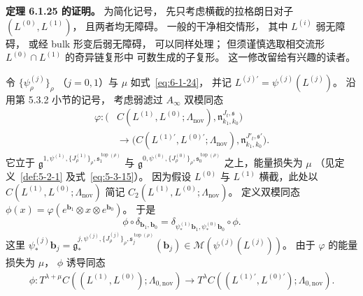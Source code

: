 \noindent\textbf{定理 6.1.25 的证明。}
为简化记号，
先只考虑横截的拉格朗日对子
$(L^{(0)},L^{(1)})$，
且两者均无障碍。
一般的干净相交情形，
其中 $L^{(i)}$ 弱无障碍，
或经 bulk 形变后弱无障碍，
可以同样处理；
但须谨慎选取相交流形
$L^{(0)}\cap L^{(1)}$
的奇异链复形中
可数生成的子复形。
这一修改留给有兴趣的读者。

令 $\{\psi_\rho^{(j)}\}_\rho$
（$j=0,1$）与 $\mu$
如式~\eqref{eq:6-1-24}，
并记 $L^{(j)\prime}=\psi^{(j)}(L^{(j)})$。
沿用第 5.3.2 小节的记号，
考虑弱滤过 $A_\infty$ 双模同态
\begin{equation}
\begin{aligned}
\varphi:\bigl(&C(L^{(1)},L^{(0)};
\Lambda_{\mathrm{nov}}),
\mathfrak n_{k_1,k_0}^{J_t,\mathfrak s}\bigr)\\
&\longrightarrow
\bigl(C(L^{(1)\prime},L^{(0)\prime};
\Lambda_{\mathrm{nov}}),
\mathfrak n_{k_1,k_0}^{J'_t,\mathfrak s'}\bigr).
\end{aligned}
\tag{6.5.14}\label{eq:6-5-14}
\end{equation}
它立于
$\mathfrak g^{1,\psi^{(1)},
\{J^{(1)}_\rho\}_\rho,
\mathfrak s_1^{\operatorname{top}(\rho)}}$
与
$\mathfrak g^{0,\psi^{(0)},
\{J^{(0)}_\rho\}_\rho,
\mathfrak s_0^{\operatorname{top}(\rho)}}$
之上，能量损失为 $\mu$
（见定义~\ref{def:5-2-1}
及式~\eqref{eq:5-3-15}）。
因为假设 $L^{(0)}$ 与 $L^{(1)}$
横截，此处以 $C(L^{(1)},L^{(0)};
\Lambda_{\mathrm{nov}})$ 简记
$C_2(L^{(1)},L^{(0)};
\Lambda_{\mathrm{nov}})$。
定义双模同态
$\phi(x)=\varphi(e^{\mathbf b_1}\otimes x
\otimes e^{\mathbf b_0})$。
于是
\begin{equation}
\phi\circ\delta_{\mathbf b_1,\mathbf b_0}
=\delta_{\psi_*^{(1)}\mathbf b_1,
\psi_*^{(0)}\mathbf b_0}\circ\phi.
\tag{6.5.15}\label{eq:6-5-15}
\end{equation}
这里
$\psi_*^{(j)}\mathbf b_j
=\mathfrak g_*^{j,\psi^{(j)},
\{J^{(j)}_\rho\}_\rho,
\mathfrak s_j^{\operatorname{top}(\rho)}}
(\mathbf b_j)
\in\mathcal M(\psi^{(j)}(L^{(j)}))$。
由于 $\varphi$ 的能量损失为 $\mu$，
$\phi$ 诱导同态
\begin{equation}
\begin{aligned}
\phi:
T^{\lambda+\mu}
C((L^{(1)},L^{(0)});\Lambda_{0,\mathrm{nov}})
\longrightarrow
T^\lambda
C((L^{(1)\prime},L^{(0)\prime});
\Lambda_{0,\mathrm{nov}}).
\end{aligned}
\tag{6.5.16}\label{eq:6-5-16}
\end{equation}


